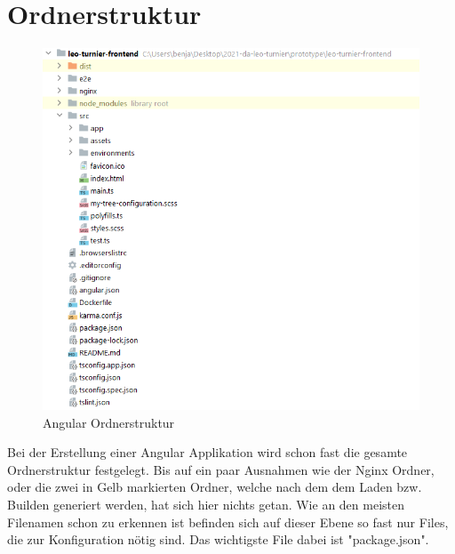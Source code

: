 
\section{Ordnerstruktur}
\begin{figure}[H]
    \includegraphics[scale=0.8]{pics/frontend/angular_file_structure.PNG}
    \caption{Angular Ordnerstruktur}
\end{figure}

Bei der Erstellung einer Angular Applikation wird schon fast die gesamte Ordnerstruktur festgelegt. Bis auf ein paar Ausnahmen wie der Nginx Ordner, oder die zwei in Gelb markierten Ordner,
welche nach dem dem Laden bzw. Builden generiert werden, hat sich hier nichts getan.
Wie an den meisten Filenamen schon zu erkennen ist befinden sich auf dieser Ebene so fast nur Files, die zur Konfiguration nötig sind. Das wichtigste File dabei ist "package.json".

